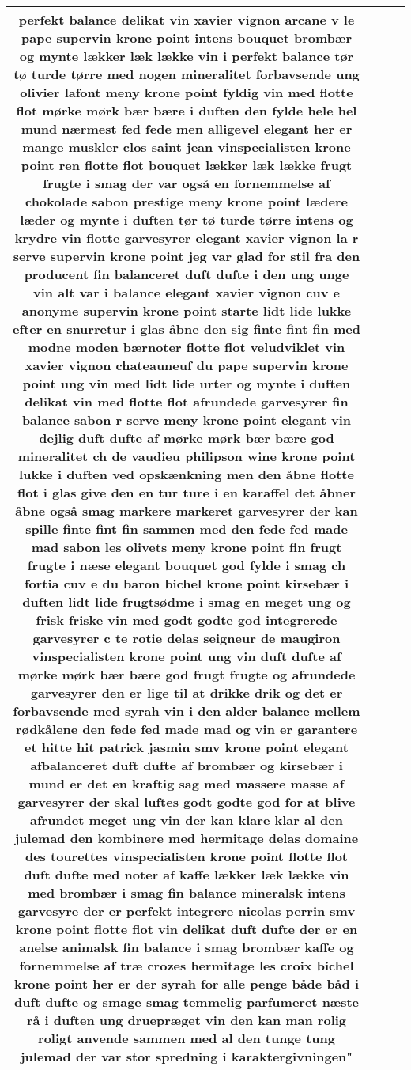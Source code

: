\begin{xltabular}{\linewidth}{@{}c|c|c|X@{}}
perfekt balance delikat vin xavier vignon arcane v le pape supervin krone point intens bouquet brombær og mynte lækker læk lække vin i perfekt balance tør tø turde tørre med nogen mineralitet forbavsende ung olivier lafont meny krone point fyldig vin med flotte flot mørke mørk bær bære i duften den fylde hele hel mund nærmest fed fede men alligevel elegant her er mange muskler clos saint jean vinspecialisten krone point ren flotte flot bouquet lækker læk lække frugt frugte i smag der var også en fornemmelse af chokolade sabon prestige meny krone point lædere læder og mynte i duften tør tø turde tørre intens og krydre vin flotte garvesyrer elegant xavier vignon la r serve supervin krone point jeg var glad for stil fra den producent fin balanceret duft dufte i den ung unge vin alt var i balance elegant xavier vignon cuv e anonyme supervin krone point starte lidt lide lukke efter en snurretur i glas åbne den sig finte fint fin med modne moden bærnoter flotte flot veludviklet vin xavier vignon chateauneuf du pape supervin krone point ung vin med lidt lide urter og mynte i duften delikat vin med flotte flot afrundede garvesyrer fin balance sabon r serve meny krone point elegant vin dejlig duft dufte af mørke mørk bær bære god mineralitet ch de vaudieu philipson wine krone point lukke i duften ved opskænkning men den åbne flotte flot i glas give den en tur ture i en karaffel det åbner åbne også smag markere markeret garvesyrer der kan spille finte fint fin sammen med den fede fed made mad sabon les olivets meny krone point fin frugt frugte i næse elegant bouquet god fylde i smag ch fortia cuv e du baron bichel krone point kirsebær i duften lidt lide frugtsødme i smag en meget ung og frisk friske vin med godt godte god integrerede garvesyrer c te rotie delas seigneur de maugiron vinspecialisten krone point ung vin duft dufte af mørke mørk bær bære god frugt frugte og afrundede garvesyrer den er lige til at drikke drik og det er forbavsende med syrah vin i den alder balance mellem rødkålene den fede fed made mad og vin er garantere et hitte hit patrick jasmin smv krone point elegant afbalanceret duft dufte af brombær og kirsebær i mund er det en kraftig sag med massere masse af garvesyrer der skal luftes godt godte god for at blive afrundet meget ung vin der kan klare klar al den julemad den kombinere med hermitage delas domaine des tourettes vinspecialisten krone point flotte flot duft dufte med noter af kaffe lækker læk lække vin med brombær i smag fin balance mineralsk intens garvesyre der er perfekt integrere nicolas perrin smv krone point flotte flot vin delikat duft dufte der er en anelse animalsk fin balance i smag brombær kaffe og fornemmelse af træ crozes hermitage les croix bichel krone point her er der syrah for alle penge både båd i duft dufte og smage smag temmelig parfumeret næste rå i duften ung druepræget vin den kan man rolig roligt anvende sammen med al den tunge tung julemad der var stor spredning i karaktergivningen" \\
		\bottomrule
	\end{xltabular}
\newpage
\twocolumn